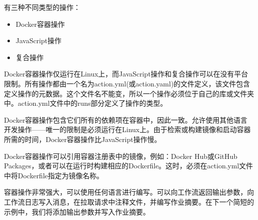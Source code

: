 
有三种不同类型的操作：

\begin{itemize}
\item 
Docker容器操作

\item 
JavaScript操作

\item 
复合操作
\end{itemize}

Docker容器操作仅运行在Linux上，而JavaScript操作和复合操作可以在没有平台限制。所有操作都由一个名为action.yml(或action.yaml)的文件定义，该文件包含定义操作的元数据。这个文件名不能变，所以一个操作必须位于自己的库或文件夹中。action.yml文件中的runs部分定义了操作的类型。

Docker容器操作包含它们所有的依赖项在容器中，因此一致。允许使用其他语言开发操作——唯一的限制是必须运行在Linux上。由于检索或构建镜像和启动容器所需的时间，Docker容器操作比JavaScript操作慢。

Docker容器操作可以引用容器注册表中的镜像，例如：Docker Hub或GitHub Packages，或者可以在运行时构建相应的Dockerfile。这时，必须在action.yml文件中将Dockerfile指定为镜像名称。


容器操作非常强大，可以使用任何语言进行编写。可以向工作流返回输出参数，向工作流日志写入消息，在拉取请求中注释文件，并编写作业摘要。在下一个简短的示例中，我们将添加输出参数并写入作业摘要。